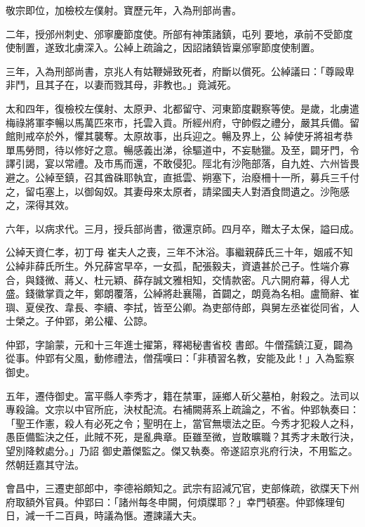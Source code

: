 \begin{pinyinscope}
 敬宗即位，加檢校左僕射。寶歷元年，入為刑部尚書。



 二年，授邠州刺史、邠寧慶節度使。所部有神策諸鎮，屯列
 要地，承前不受節度使制置，遂致北虜深入。公綽上疏論之，因詔諸鎮皆稟邠寧節度使制置。



 三年，入為刑部尚書，京兆人有姑鞭婦致死者，府斷以償死。公綽議曰：「尊毆卑非鬥，且其子在，以妻而戮其母，非教也。」竟減死。



 太和四年，復檢校左僕射、太原尹、北都留守、河東節度觀察等使。是歲，北虜遣梅祿將軍李暢以馬萬匹來市，托雲入貢。所經州府，守帥假之禮分，嚴其兵備。留館則戒卒於外，懼其襲奪。太原故事，出兵迎之。暢及界上，公
 綽使牙將祖考恭單馬勞問，待以修好之意。暢感義出涕，徐驅道中，不妄馳獵。及至，闢牙門，令譯引謁，宴以常禮。及市馬而還，不敢侵犯。陘北有沙陁部落，自九姓、六州皆畏避之。公綽至鎮，召其酋硃耶執宜，直抵雲、朔塞下，治廢柵十一所，募兵三千付之，留屯塞上，以御匈奴。其妻母來太原者，請梁國夫人對酒食問遺之。沙陁感之，深得其效。



 六年，以病求代。三月，授兵部尚書，徵還京師。四月卒，贈太子太保，謚曰成。



 公綽天資仁孝，初丁母
 崔夫人之喪，三年不沐浴。事繼親薛氏三十年，姻戚不知公綽非薛氏所生。外兄薛宮早卒，一女孤，配張毅夫，資遺甚於己子。性端介寡合，與錢微、蔣乂、杜元穎、薛存誠文雅相知，交情款密。凡六開府幕，得人尤盛。錢徽掌貢之年，鄭朗覆落，公綽將赴襄陽，首闢之，朗竟為名相。盧簡辭、崔璵、夏侯孜、韋長、李續、李拭，皆至公卿。為吏部侍郎，與舅左丞崔從同省，人士榮之。子仲郢，弟公權、公諒。



 仲郢，字諭蒙，元和十三年進士擢第，釋褐秘書省校
 書郎。牛僧孺鎮江夏，闢為從事。仲郢有父風，動修禮法，僧孺嘆曰：「非積習名教，安能及此！」入為監察御史。



 五年，遷侍御史。富平縣人李秀才，籍在禁軍，誣鄉人斫父墓柏，射殺之。法司以專殺論。文宗以中官所庇，決杖配流。右補闕蔣系上疏論之，不省。仲郢執奏曰：「聖王作憲，殺人有必死之令；聖明在上，當官無壞法之臣。今秀才犯殺人之科，愚臣備監決之任，此賊不死，是亂典章。臣雖至微，豈敢曠職？其秀才未敢行決，望別降敕處分。」乃詔
 御史蕭傑監之。傑又執奏。帝遂詔京兆府行決，不用監之。然朝廷嘉其守法。



 會昌中，三遷吏部郎中，李德裕頗知之。武宗有詔減冗官，吏部條疏，欲牒天下州府取額外官員。仲郢曰：「諸州每冬申闕，何煩牒耶？」幸門頓塞。仲郢條理旬日，減一千二百員，時議為愜。遷諫議大夫。




\end{pinyinscope}
